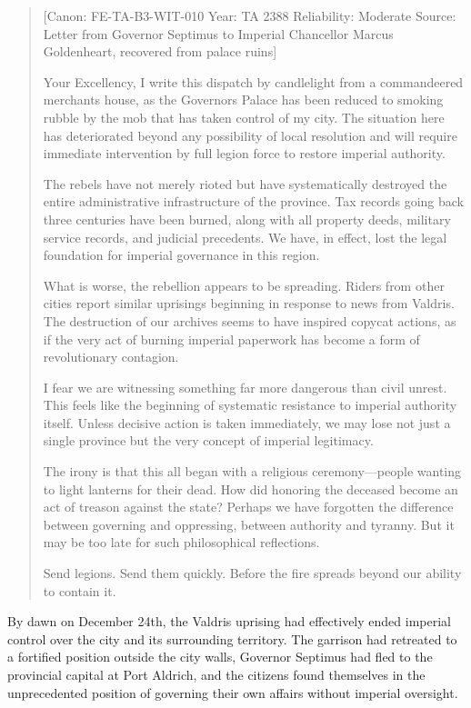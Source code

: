 \begin{quote}
{[}Canon: FE-TA-B3-WIT-010 \textbar{} Year: TA 2388 \textbar{}
Reliability: Moderate \textbar{} Source: Letter from Governor Septimus
to Imperial Chancellor Marcus Goldenheart, recovered from palace
ruins{]}

Your Excellency, I write this dispatch by candlelight from a
commandeered merchant\textquotesingle s house, as the
Governor\textquotesingle s Palace has been reduced to smoking rubble by
the mob that has taken control of my city. The situation here has
deteriorated beyond any possibility of local resolution and will require
immediate intervention by full legion force to restore imperial
authority.

The rebels have not merely rioted but have systematically destroyed the
entire administrative infrastructure of the province. Tax records going
back three centuries have been burned, along with all property deeds,
military service records, and judicial precedents. We have, in effect,
lost the legal foundation for imperial governance in this region.

What is worse, the rebellion appears to be spreading. Riders from other
cities report similar uprisings beginning in response to news from
Valdris. The destruction of our archives seems to have inspired copycat
actions, as if the very act of burning imperial paperwork has become a
form of revolutionary contagion.

I fear we are witnessing something far more dangerous than civil unrest.
This feels like the beginning of systematic resistance to imperial
authority itself. Unless decisive action is taken immediately, we may
lose not just a single province but the very concept of imperial
legitimacy.

The irony is that this all began with a religious ceremony---people
wanting to light lanterns for their dead. How did honoring the deceased
become an act of treason against the state? Perhaps we have forgotten
the difference between governing and oppressing, between authority and
tyranny. But it may be too late for such philosophical reflections.

Send legions. Send them quickly. Before the fire spreads beyond our
ability to contain it.
\end{quote}

By dawn on December 24th, the Valdris uprising had effectively ended
imperial control over the city and its surrounding territory. The
garrison had retreated to a fortified position outside the city walls,
Governor Septimus had fled to the provincial capital at Port Aldrich,
and the citizens found themselves in the unprecedented position of
governing their own affairs without imperial oversight.

